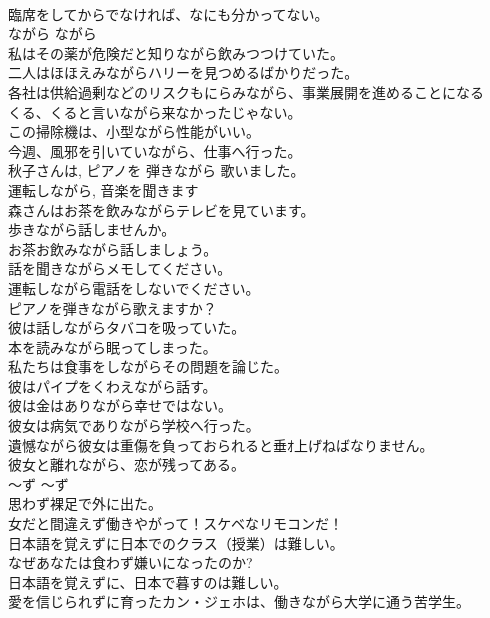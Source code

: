 \documentclass[8pt]{extreport}
\begin{document}
\begin{CJK}{UTF8}{min}
\\	臨席をしてからでなければ、なにも分かってない。  
\\	ながら	ながら	
\\	私はその薬が危険だと知りながら飲みつつけていた。  
\\	二人はほほえみながらハリーを見つめるばかりだった。  
\\	各社は供給過剰などのリスクもにらみながら、事業展開を進めることになる  
\\	くる、くると言いながら来なかったじゃない。  
\\	この掃除機は、小型ながら性能がいい。  
\\	今週、風邪を引いていながら、仕事へ行った。  
\\	秋子さんは, ピアノを 弾きながら 歌いました。  
\\	運転しながら, 音楽を聞きます  
\\	森さんはお茶を飲みながらテレビを見ています。  
\\	歩きながら話しませんか。   
\\	お茶お飲みながら話しましょう。   
\\	話を聞きながらメモしてください。  
\\	運転しながら電話をしないでください。   
\\	ピアノを弾きながら歌えますか？   
\\	彼は話しながらタバコを吸っていた。   
\\	本を読みながら眠ってしまった。   
\\	私たちは食事をしながらその問題を論じた。   
\\	彼はパイプをくわえながら話す。   
\\	彼は金はありながら幸せではない。   
\\	彼女は病気でありながら学校へ行った。   
\\	遺憾ながら彼女は重傷を負っておられると垂ｵ上げねばなりません。   
\\	彼女と離れながら、恋が残ってある。  
\\	〜ず	〜ず	
\\	思わず裸足で外に出た。  
\\	女だと間違えず働きやがって！スケベなリモコンだ！  
\\	日本語を覚えずに日本でのクラス（授業）は難しい。  
\\	なぜあなたは食わず嫌いになったのか?  
\\	日本語を覚えずに、日本で暮すのは難しい。  
\\	愛を信じられずに育ったカン・ジェホは、働きながら大学に通う苦学生。   

\end{CJK}
\end{document}
